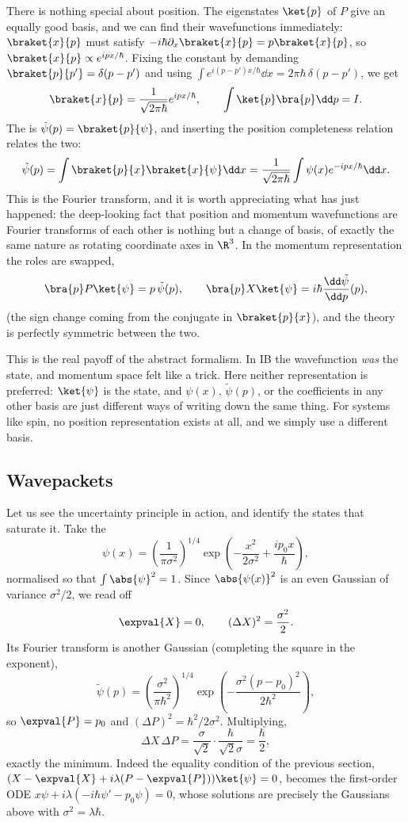 There is nothing special about position. The eigenstates $\ket{p}$ of $P$ give an equally good basis, and we can find their wavefunctions immediately: $\braket{x}{p}$ must satisfy $-i\hbar \partial_x \braket{x}{p} = p \braket{x}{p}$, so $\braket{x}{p} \propto e^{ipx/\hbar}$. Fixing the constant by demanding $\braket{p}{p'} = \delta(p-p')$ and using $\int e^{i(p - p')x/\hbar}\dd x = 2\pi\hbar \, \delta(p-p')$, we get
$$
\braket{x}{p} = \frac{1}{\sqrt{2\pi\hbar}} e^{ipx/\hbar}, \qquad \int \ket{p}\bra{p} \dd p = I.
$$
The  is $\tilde\psi(p) = \braket{p}{\psi}$, and inserting the position completeness relation relates the two:
$$
\tilde\psi(p) = \int \braket{p}{x}\braket{x}{\psi}\dd x = \frac{1}{\sqrt{2\pi\hbar}}\int \psi(x) e^{-ipx/\hbar} \dd x.
$$
This is the Fourier transform, and it is worth appreciating what has just happened: the deep-looking fact that position and momentum wavefunctions are Fourier transforms of each other is nothing but a change of basis, of exactly the same nature as rotating coordinate axes in $\R^3$. In the momentum representation the roles are swapped,
$$
\bra{p}P\ket{\psi} = p\,\tilde\psi(p), \qquad \bra{p}X\ket{\psi} = i\hbar\frac{\dd\tilde\psi}{\dd p}(p),
$$
(the sign change coming from the conjugate in $\braket{p}{x}$), and the theory is perfectly symmetric between the two.

\begin{remark}
    This is the real payoff of the abstract formalism. In IB the wavefunction \emph{was} the state, and momentum space felt like a trick. Here neither representation is preferred: $\ket{\psi}$ is the state, and $\psi(x)$, $\tilde\psi(p)$, or the coefficients in any other basis are just different ways of writing down the same thing. For systems like spin, no position representation exists at all, and we simply use a different basis.
\end{remark}

\subsection{Wavepackets}\label{sec:wavepackets}

Let us see the uncertainty principle in action, and identify the states that saturate it. Take the 
$$
\psi(x) = \left(\frac{1}{\pi \sigma^2}\right)^{1/4} \exp\left(-\frac{x^2}{2\sigma^2} + \frac{i p_0 x}{\hbar}\right),
$$
normalised so that $\int \abs{\psi}^2 = 1$. Since $\abs{\psi(x)}^2$ is an even Gaussian of variance $\sigma^2/2$, we read off
$$
\expval{X} = 0, \qquad (\Delta X)^2 = \frac{\sigma^2}{2}.
$$
Its Fourier transform is another Gaussian (completing the square in the exponent),
$$
\tilde\psi(p) = \left(\frac{\sigma^2}{\pi\hbar^2}\right)^{1/4} \exp\left( -\frac{\sigma^2 (p-p_0)^2}{2\hbar^2} \right),
$$
so $\expval{P} = p_0$ and $(\Delta P)^2 = \hbar^2/2\sigma^2$. Multiplying,
$$
\Delta X \, \Delta P = \frac{\sigma}{\sqrt2}\cdot\frac{\hbar}{\sqrt2 \sigma} = \frac{\hbar}{2},
$$
exactly the minimum. Indeed the equality condition of the previous section, $(X - \expval{X} + i\lambda(P - \expval{P}))\ket{\psi} = 0$, becomes the first-order ODE $x\psi + i\lambda(-i\hbar\psi' - p_0\psi) = 0$, whose solutions are precisely the Gaussians above with $\sigma^2 = \lambda\hbar$.


